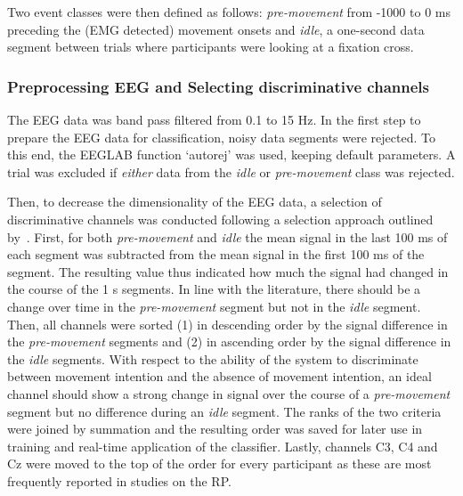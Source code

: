 
Two event classes were then defined as follows: \textit{pre-movement} from -1000 to 0 ms preceding the (EMG detected) movement onsets and \textit{idle}, a one-second data segment between trials where participants were looking at a fixation cross.

\subsubsection{Preprocessing EEG and Selecting discriminative channels}\label{eeg_methods}
The EEG data was band pass filtered from 0.1 to 15 Hz. In the first step to prepare the EEG data for classification, noisy data segments were rejected. To this end, the EEGLAB function `autorej' was used, keeping default parameters. A trial was excluded if \textit{either} data from the \textit{idle} or \textit{pre-movement} class was rejected.

Then, to decrease the dimensionality of the EEG data, a selection of discriminative channels was conducted following a selection approach outlined by~\citep{Schultze-Kraft2021-cu}. First, for both \textit{pre-movement} and \textit{idle} the mean signal in the last 100 ms of each segment was subtracted from the mean signal in the first 100 ms of the segment. The resulting value thus indicated how much the signal had changed in the course of the 1 s segments. In line with the literature, there should be a change over time in the \textit{pre-movement} segment but not in the \textit{idle} segment. Then, all channels were sorted (1) in descending order by the signal difference in the \textit{pre-movement} segments and (2) in ascending order by the signal difference in the \textit{idle} segments. With respect to the ability of the system to discriminate between movement intention and the absence of movement intention, an ideal channel should show a strong change in signal over the course of a \textit{pre-movement} segment but no difference during an \textit{idle} segment. The ranks of the two criteria were joined by summation and the resulting order was saved for later use in training and real-time application of the classifier. Lastly, channels C3, C4 and Cz were moved to the top of the order for every participant as these are most frequently reported in studies on the RP.

